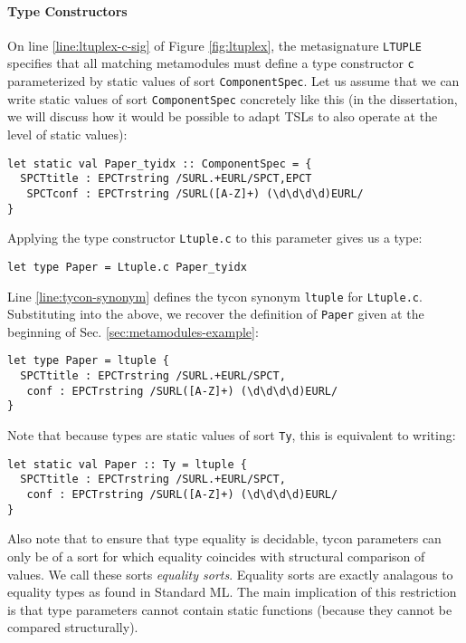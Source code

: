 \paragraph{Type Constructors} On line \ref{line:ltuplex-c-sig} of Figure \ref{fig:ltuplex}, the metasignature \lstinline{LTUPLE} specifies that all matching metamodules must define a type constructor \lstinline{c} parameterized by {static values} of {sort} \lstinline{ComponentSpec}. %
Let us assume that we can write static values of sort \lstinline{ComponentSpec} concretely like this (in the dissertation, we will discuss how it would be possible to adapt TSLs to also operate at the level of static values):
\begin{lstlisting}[numbers=none]
let static val Paper_tyidx :: ComponentSpec = {
  SPCTtitle : EPCTrstring /SURL.+EURL/SPCT,EPCT
   SPCTconf : EPCTrstring /SURL([A-Z]+) (\d\d\d\d)EURL/
}
\end{lstlisting}
Applying the type constructor \lstinline{Ltuple.c} to this parameter gives us a type:
\begin{lstlisting}[numbers=none]
let type Paper = Ltuple.c Paper_tyidx
\end{lstlisting}
Line \ref{line:tycon-synonym} defines the tycon synonym \lstinline{ltuple} for \lstinline{Ltuple.c}. Substituting into the above, we recover the definition of \lstinline{Paper} given at the beginning of Sec. \ref{sec:metamodules-example}:
\begin{lstlisting}[numbers=none]
let type Paper = ltuple {
  SPCTtitle : EPCTrstring /SURL.+EURL/SPCT,
   conf : EPCTrstring /SURL([A-Z]+) (\d\d\d\d)EURL/
}
\end{lstlisting}
Note that because types are static values of sort \lstinline{Ty}, this is equivalent to writing:
\begin{lstlisting}[numbers=none]
let static val Paper :: Ty = ltuple {
  SPCTtitle : EPCTrstring /SURL.+EURL/SPCT,
   conf : EPCTrstring /SURL([A-Z]+) (\d\d\d\d)EURL/
}
\end{lstlisting}

Also note that to ensure that type equality is decidable, tycon parameters can only be of a sort for which equality coincides with structural comparison of values. We call these sorts \emph{equality sorts}. Equality sorts are exactly analagous to equality types as found in Standard ML. The main implication of this restriction is that type parameters cannot contain static functions (because they cannot be compared structurally).

